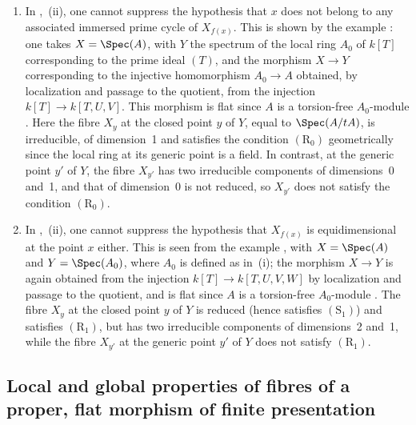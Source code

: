 \begin{remarks}[12.1.8]
\label{IV.12.1.8}
\begin{enumerate}[label=(\roman*)]
  \item In ,~(ii), one cannot suppress the hypothesis that $x$ does not belong to any associated immersed prime cycle of $X_{f(x)}$.
This is shown by the example : one takes $X=\Spec(A)$, with $Y$ the spectrum of the local ring $A_0$ of $k[T]$ corresponding to the prime ideal $(T)$, and the morphism $X\to Y$ corresponding to the injective homomorphism $A_0\to A$ obtained, by localization and passage to the quotient, from the injection $k[T]\to k[T,U,V]$.
This morphism is flat since $A$ is a torsion-free $A_0$-module .
Here the fibre $X_y$ at the closed point $y$ of $Y$, equal to $\Spec(A/tA)$, is irreducible, of dimension~1 and satisfies the condition $(\mathrm{R}_0)$ geometrically since the local ring at its generic point is a field.
In contrast, at the generic point $y'$ of $Y$, the fibre $X_{y'}$ has two irreducible components of dimensions~0 and~1, and that of dimension~0 is not reduced, so $X_{y'}$ does not satisfy the condition $(\mathrm{R}_0)$.

  \item In ,~(ii), one cannot suppress the hypothesis that $X_{f(x)}$ is equidimensional at the point $x$ either.
This is seen from the example , with $X=\Spec(A)$ and $Y=\Spec(A_0)$, where $A_0$ is defined as in~(i); the morphism $X\to Y$ is again obtained from the injection $k[T]\to k[T,U,V,W]$ by localization and passage to the quotient, and is flat since $A$ is a torsion-free $A_0$-module .
The fibre $X_y$ at the closed point $y$ of $Y$ is reduced (hence satisfies $(\mathrm{S}_1)$) and satisfies $(\mathrm{R}_1)$, but has two irreducible components of dimensions~2 and~1, while the fibre $X_{y'}$ at the generic point $y'$ of $Y$ does not satisfy $(\mathrm{R}_1)$.
\end{enumerate}
\end{remarks}


\subsection{Local and global properties of fibres of a proper, flat morphism of finite presentation}
\label{subsection:IV.12.2}



